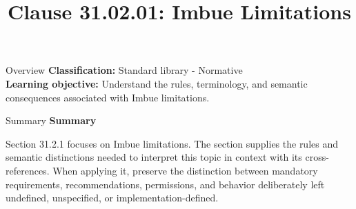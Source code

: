 \documentclass[10pt,letterpaper]{article}
\title{Clause 31.02.01: Imbue Limitations}
\author{}
\date{}
\begin{document}
\maketitle
\begin{CornellOverviewBox}{Overview}
\textbf{Classification:} Standard library - Normative\\[2pt]
\textbf{Learning objective:} Understand the rules, terminology, and semantic consequences associated with Imbue limitations.
\end{CornellOverviewBox}\begin{CornellSummaryBox}{Summary}
{\sffamily\bfseries\color{Accent} Summary}\par\vspace{3pt}Section 31.2.1 focuses on Imbue limitations. The section supplies the rules and semantic distinctions needed to interpret this topic in context with its cross-references. When applying it, preserve the distinction between mandatory requirements, recommendations, permissions, and behavior deliberately left undefined, unspecified, or implementation-defined.
\end{CornellSummaryBox}
\end{document}
